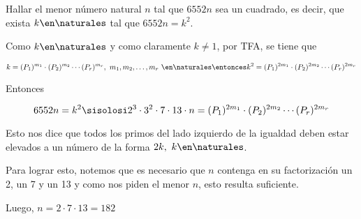 \begin{enunciado}{\ejercicio}
    Hallar el menor número natural $n$ tal que $6552n$ sea un cuadrado, es decir, que exista $k \en \naturales$ tal que $6552n=k^2$.
 \end{enunciado}

 Como $k \en \naturales$ y como claramente $k \neq 1$, por TFA, se tiene que

 $$
 k = (P_1)^{m_1} \cdot (P_2)^{m_2} \cdots (P_r)^{m_r}, ~ m_1,  m_2, \dots, m_r ~ \en \naturales
 \entonces
 k^2= (P_1)^{2m_1} \cdot (P_2)^{2m_2} \cdots (P_r)^{2m_r}
 $$

 Entonces 

 $$
 6552n=k^2
 \sisolosi
 2^3 \cdot 3^2 \cdot 7 \cdot 13 \cdot n =  (P_1)^{2m_1} \cdot (P_2)^{2m_2} \cdots (P_r)^{2m_r}
 $$

 Esto nos dice que todos los primos del lado izquierdo de la igualdad deben estar elevados a un número de la forma $2k, ~ k \en \naturales$. \par
Para lograr esto, notemos que  es necesario que $n$ contenga en su factorización un 2, un 7 y un 13 y como nos piden el menor $n$, esto resulta suficiente. \par
Luego, $n = 2 \cdot 7 \cdot 13 = \boxed{182}$


\begin{aportes}
    \item {}
\end{aportes}